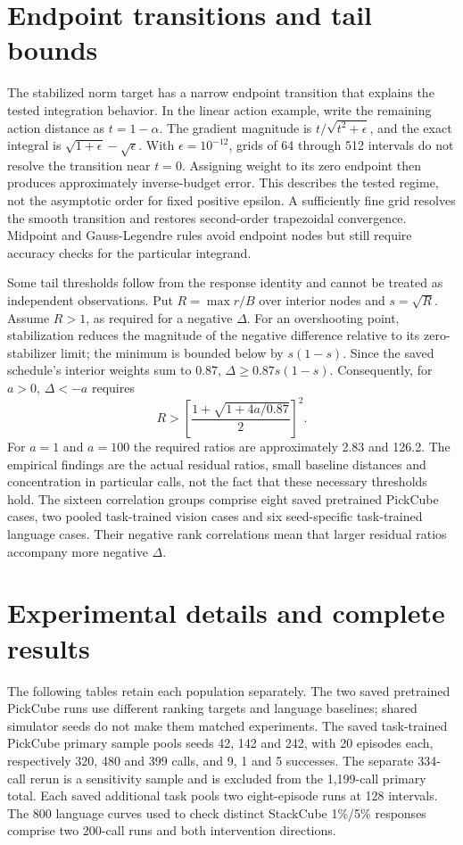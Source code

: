 \documentclass[12pt,letterpaper]{article}
\begin{document}
\section{Endpoint transitions and tail bounds}

The stabilized norm target has a narrow endpoint transition that explains the tested integration behavior. In the linear action example, write the remaining action distance as $t=1-\alpha$. The gradient magnitude is $t/\sqrt{t^2+\epsilon}$, and the exact integral is $\sqrt{1+\epsilon}-\sqrt\epsilon$. With $\epsilon=10^{-12}$, grids of 64 through 512 intervals do not resolve the transition near $t=0$. Assigning weight to its zero endpoint then produces approximately inverse-budget error. This describes the tested regime, not the asymptotic order for fixed positive epsilon. A sufficiently fine grid resolves the smooth transition and restores second-order trapezoidal convergence. Midpoint and Gauss-Legendre rules avoid endpoint nodes but still require accuracy checks for the particular integrand.

Some tail thresholds follow from the response identity and cannot be treated as independent observations. Put $R=\max r/B$ over interior nodes and $s=\sqrt R$. Assume $R>1$, as required for a negative $\Delta$. For an overshooting point, stabilization reduces the magnitude of the negative difference relative to its zero-stabilizer limit; the minimum is bounded below by $s(1-s)$. Since the saved schedule's interior weights sum to 0.87, $\Delta\ge0.87s(1-s)$. Consequently, for $a>0$, $\Delta<-a$ requires
\[
R>\left[\frac{1+\sqrt{1+4a/0.87}}{2}\right]^2.
\]
For $a=1$ and $a=100$ the required ratios are approximately 2.83 and 126.2. The empirical findings are the actual residual ratios, small baseline distances and concentration in particular calls, not the fact that these necessary thresholds hold. The sixteen correlation groups comprise eight saved pretrained PickCube cases, two pooled task-trained vision cases and six seed-specific task-trained language cases. Their negative rank correlations mean that larger residual ratios accompany more negative $\Delta$.

\section{Experimental details and complete results}

The following tables retain each population separately. The two saved pretrained PickCube runs use different ranking targets and language baselines; shared simulator seeds do not make them matched experiments. The saved task-trained PickCube primary sample pools seeds 42, 142 and 242, with 20 episodes each, respectively 320, 480 and 399 calls, and 9, 1 and 5 successes. The separate 334-call rerun is a sensitivity sample and is excluded from the 1,199-call primary total. Each saved additional task pools two eight-episode runs at 128 intervals. The 800 language curves used to check distinct StackCube 1\%/5\% responses comprise two 200-call runs and both intervention directions.
\end{document}
